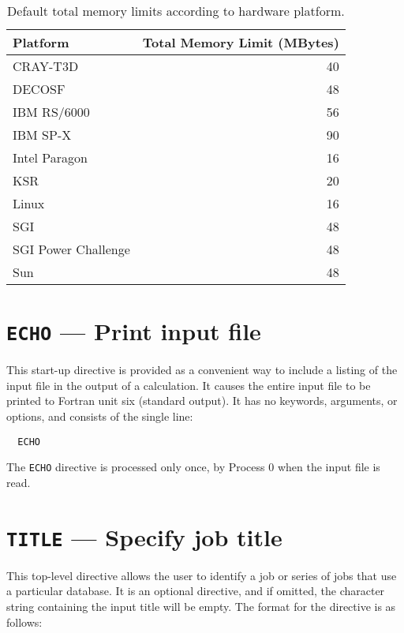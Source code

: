 
\begin{table}

\center

\label{tbl:default-memory-limits}

\begin{tabular}{lr}
\hline\hline
Platform        & Total Memory Limit (MBytes) \\
\hline
CRAY-T3D        & 40 \\
DECOSF          & 48 \\
IBM RS/6000     & 56 \\
IBM SP-X        & 90 \\
Intel Paragon   & 16 \\
KSR             & 20 \\
Linux           & 16 \\
SGI             & 48 \\
SGI Power Challenge  & 48 \\
Sun             & 48 \\
\hline\hline
\end{tabular}

\caption{Default total memory limits according to hardware platform.}


\end{table}

\section{{\tt ECHO} --- Print input file}
\label{sec:echo}

This start-up directive is provided as a convenient way to include a
listing of the input file in the output of a calculation.  It causes
the entire input file to be printed to Fortran unit six (standard
output).  It has no keywords, arguments, or options, and consists of
the single line:

\begin{verbatim}
  ECHO
\end{verbatim}

The \verb+ECHO+ directive is processed only
once, by Process 0 when the input file is read.

\section{{\tt TITLE} --- Specify job title}

This top-level directive allows the user to identify a job or series of 
jobs that use a
particular database.  It is an optional directive, and if omitted, the 
character string containing the input title will be empty.  The format for 
the directive is as follows:

